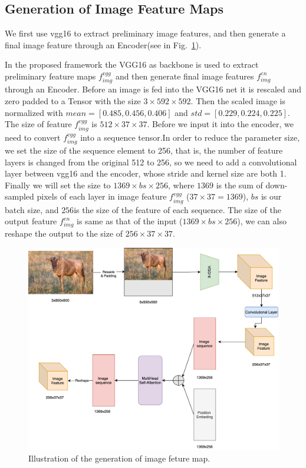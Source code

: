 \subsection{Generation of Image Feature Maps }

We first use vgg16 to extract preliminary image features, and then generate a final image feature through an Encoder(see in Fig.~\ref{fig:imgfeatbaseline}).

In the proposed framework the VGG16 as backbone is used to extract preliminary feature maps $f^{vgg}_{img}$ and  then generate final image features $f^{en}_{img}$ through an Encoder. Before an image is fed into the VGG16 net it is rescaled and zero padded to a Tensor with the size $ 3\times592\times592 $. Then the scaled image is normalized with $ mean = [0.485, 0.456, 0.406 ]$ and $ std = [ 0.229, 0.224, 0.225]$.   The size of feature $f^{vgg}_{img}$ is $512 \times 37 \times 37$. Before we input it into the encoder, we need to convert $f^{vgg}_{img}$  into a sequence tensor.In order to reduce the parameter size, we set the size of the sequence element to 256, that is, the number of feature layers is changed from the original 512 to 256, so we need to add a convolutional layer between vgg16 and the encoder, whose stride and kernel size are both 1. Finally we will set the size to $ 1369 \times bs \times 256 $, where $ 1369 $ is the sum of down-sampled pixels of each layer in image feature $f^{vgg}_{img}$ ($ 37 \times 37 = 1369$), $ bs $ is our batch size, and $ 256  $is the size of the feature of each sequence. The size of the output feature $f^{en}_{img}$ is same as that of the input ($ 1369 \times bs \times 256 $), we can also reshape the output to the size of $256 \times 37 \times 37$.


\begin{figure}[tbph!]
	\centering
	\includegraphics[width=0.9\linewidth]{figures/img_feat_baseline}
	\caption[Generation of Image Feature Map]{Illustration of the generation of image feture map.}
	\label{fig:imgfeatbaseline}
\end{figure}


